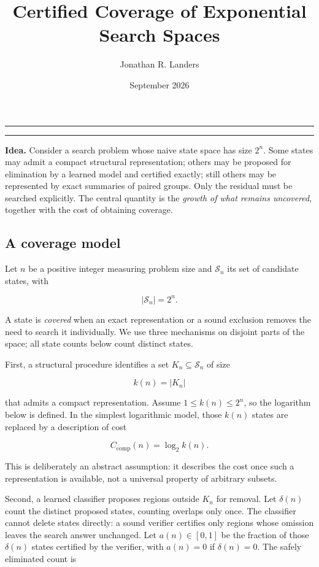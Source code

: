 \documentclass[
  10pt,
  english,
]{article}
\title{\sffamily\bfseries Certified Coverage of Exponential Search Spaces}
\author{Jonathan R. Landers}
\date{September 2026}
\begin{document}
\maketitle
\vspace{-.9em}
\noindent\textcolor{paperaccent}{\rule{.11\linewidth}{1.5pt}}\textcolor{paperline}{\rule{.89\linewidth}{.45pt}}
\vspace{.65em}

\begin{tcolorbox}[accentbox]
\noindent\textbf{Idea.} Consider a search problem whose naive state space has size
\(2^n\). Some states may admit a compact structural representation;
others may be proposed for elimination by a learned model and certified
exactly; still others may be represented by exact summaries of paired
groups. Only the residual must be searched explicitly. The central
quantity is the \emph{growth of what remains uncovered}, together with
the cost of obtaining coverage.
\end{tcolorbox}

\hypertarget{a-coverage-model}{%
\subsection{A coverage model}\label{a-coverage-model}}

Let \(n\) be a positive integer measuring problem size and \(\mathcal{S}_n\) its set
of candidate states, with

\[
|\mathcal{S}_n| = 2^n .
\]

A state is \emph{covered} when an exact representation or a sound
exclusion removes the need to search it individually. We use three
mechanisms on disjoint parts of the space; all state counts below count
distinct states.

First, a structural procedure identifies a set
\(K_n \subseteq \mathcal{S}_n\) of size

\[
k(n) = |K_n|
\]

that admits a compact representation. Assume
\(1\le k(n)\le 2^n\), so the logarithm below is defined. In the simplest
logarithmic model, those \(k(n)\) states are replaced by a description of
cost

\[
C_{\mathrm{comp}}(n) = \log_2 k(n).
\]

This is deliberately an abstract assumption: it describes the cost once
such a representation is available, not a universal property of
arbitrary subsets.

Second, a learned classifier proposes regions outside \(K_n\) for
removal. Let \(\delta(n)\) count the distinct proposed states, counting
overlaps only once. The classifier cannot delete states directly: a
sound verifier certifies only regions whose omission leaves the search
answer unchanged. Let \(a(n)\in[0,1]\) be the fraction of those
\(\delta(n)\) states certified by the verifier, with \(a(n)=0\) if
\(\delta(n)=0\). The safely eliminated count is
\end{document}
